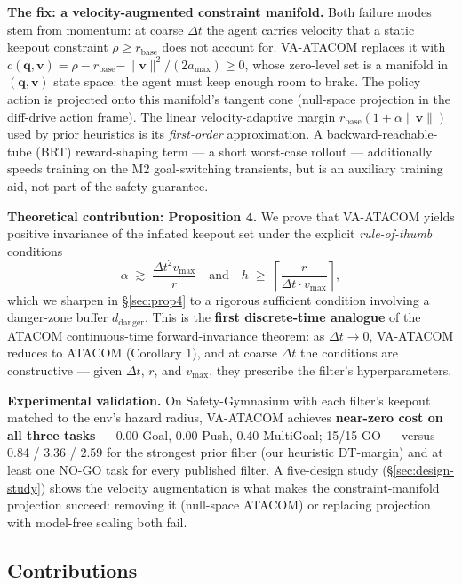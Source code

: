 \documentclass[letterpaper]{article}
\begin{document}
\textbf{The fix: a velocity-augmented constraint manifold.} Both failure modes stem from momentum: at coarse $\Delta t$ the agent carries velocity that a static keepout constraint $\rho \ge r_\text{base}$ does not account for. VA-ATACOM replaces it with $c(\boldsymbol{q},\boldsymbol{v}) = \rho - r_\text{base} - \|\boldsymbol{v}\|^2/(2a_{\max}) \ge 0$, whose zero-level set is a manifold in $(\boldsymbol{q},\boldsymbol{v})$ state space: the agent must keep enough room to brake. The policy action is projected onto this manifold's tangent cone (null-space projection in the diff-drive action frame). The linear velocity-adaptive margin $r_\text{base}(1+\alpha\|\boldsymbol{v}\|)$ used by prior heuristics is its \emph{first-order} approximation. A backward-reachable-tube (BRT) reward-shaping term --- a short worst-case rollout --- additionally speeds training on the M2 goal-switching transients, but is an auxiliary training aid, not part of the safety guarantee.

\textbf{Theoretical contribution: Proposition 4.} We prove that VA-ATACOM yields positive invariance of the inflated keepout set under the explicit \emph{rule-of-thumb} conditions
\begin{equation}
\alpha \;\gtrsim\; \frac{\Delta t^2 v_{\max}}{r}
\quad\text{and}\quad
h \;\ge\; \left\lceil \frac{r}{\Delta t \cdot v_{\max}} \right\rceil,
\end{equation}
which we sharpen in \S\ref{sec:prop4} to a rigorous sufficient condition involving a danger-zone buffer $d_\text{danger}$. This is the \textbf{first discrete-time analogue} of the ATACOM continuous-time forward-invariance theorem: as $\Delta t \to 0$, VA-ATACOM reduces to ATACOM (Corollary 1), and at coarse $\Delta t$ the conditions are constructive — given $\Delta t$, $r$, and $v_{\max}$, they prescribe the filter's hyperparameters.

\textbf{Experimental validation.} On Safety-Gymnasium with each filter's keepout matched to the env's hazard radius, VA-ATACOM achieves \textbf{near-zero cost on all three tasks} --- 0.00 Goal, 0.00 Push, 0.40 MultiGoal; 15/15 GO --- versus 0.84 / 3.36 / 2.59 for the strongest prior filter (our heuristic DT-margin) and at least one NO-GO task for every published filter. A five-design study (\S\ref{sec:design-study}) shows the velocity augmentation is what makes the constraint-manifold projection succeed: removing it (null-space ATACOM) or replacing projection with model-free scaling both fail.

\subsection{Contributions}
\end{document}
